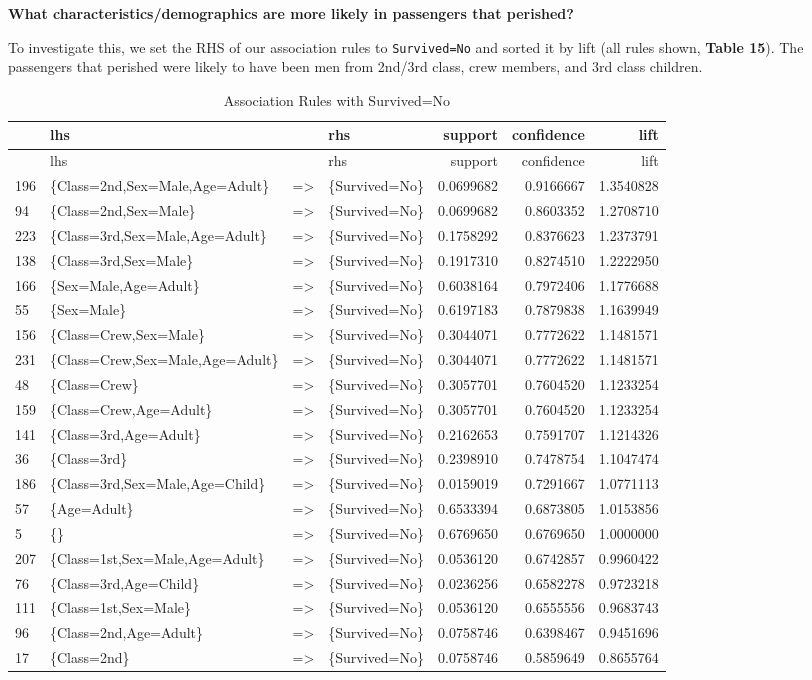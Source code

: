\documentclass[]{article}
\begin{document}
\textbf{What characteristics/demographics are more likely in passengers
that perished?}

To investigate this, we set the RHS of our association rules to
\texttt{Survived=No} and sorted it by lift (all rules shown,
\textbf{Table 15}). The passengers that perished were likely to have
been men from 2nd/3rd class, crew members, and 3rd class children.

\begin{longtable}[c]{@{}llllrrr@{}}
\caption{Association Rules with Survived=No}\tabularnewline
\toprule
& lhs & & rhs & support & confidence & lift\tabularnewline
\midrule
\endfirsthead
\toprule
& lhs & & rhs & support & confidence & lift\tabularnewline
\midrule
\endhead
196 & \{Class=2nd,Sex=Male,Age=Adult\} & =\textgreater{} &
\{Survived=No\} & 0.0699682 & 0.9166667 & 1.3540828\tabularnewline
94 & \{Class=2nd,Sex=Male\} & =\textgreater{} & \{Survived=No\} &
0.0699682 & 0.8603352 & 1.2708710\tabularnewline
223 & \{Class=3rd,Sex=Male,Age=Adult\} & =\textgreater{} &
\{Survived=No\} & 0.1758292 & 0.8376623 & 1.2373791\tabularnewline
138 & \{Class=3rd,Sex=Male\} & =\textgreater{} & \{Survived=No\} &
0.1917310 & 0.8274510 & 1.2222950\tabularnewline
166 & \{Sex=Male,Age=Adult\} & =\textgreater{} & \{Survived=No\} &
0.6038164 & 0.7972406 & 1.1776688\tabularnewline
55 & \{Sex=Male\} & =\textgreater{} & \{Survived=No\} & 0.6197183 &
0.7879838 & 1.1639949\tabularnewline
156 & \{Class=Crew,Sex=Male\} & =\textgreater{} & \{Survived=No\} &
0.3044071 & 0.7772622 & 1.1481571\tabularnewline
231 & \{Class=Crew,Sex=Male,Age=Adult\} & =\textgreater{} &
\{Survived=No\} & 0.3044071 & 0.7772622 & 1.1481571\tabularnewline
48 & \{Class=Crew\} & =\textgreater{} & \{Survived=No\} & 0.3057701 &
0.7604520 & 1.1233254\tabularnewline
159 & \{Class=Crew,Age=Adult\} & =\textgreater{} & \{Survived=No\} &
0.3057701 & 0.7604520 & 1.1233254\tabularnewline
141 & \{Class=3rd,Age=Adult\} & =\textgreater{} & \{Survived=No\} &
0.2162653 & 0.7591707 & 1.1214326\tabularnewline
36 & \{Class=3rd\} & =\textgreater{} & \{Survived=No\} & 0.2398910 &
0.7478754 & 1.1047474\tabularnewline
186 & \{Class=3rd,Sex=Male,Age=Child\} & =\textgreater{} &
\{Survived=No\} & 0.0159019 & 0.7291667 & 1.0771113\tabularnewline
57 & \{Age=Adult\} & =\textgreater{} & \{Survived=No\} & 0.6533394 &
0.6873805 & 1.0153856\tabularnewline
5 & \{\} & =\textgreater{} & \{Survived=No\} & 0.6769650 & 0.6769650 &
1.0000000\tabularnewline
207 & \{Class=1st,Sex=Male,Age=Adult\} & =\textgreater{} &
\{Survived=No\} & 0.0536120 & 0.6742857 & 0.9960422\tabularnewline
76 & \{Class=3rd,Age=Child\} & =\textgreater{} & \{Survived=No\} &
0.0236256 & 0.6582278 & 0.9723218\tabularnewline
111 & \{Class=1st,Sex=Male\} & =\textgreater{} & \{Survived=No\} &
0.0536120 & 0.6555556 & 0.9683743\tabularnewline
96 & \{Class=2nd,Age=Adult\} & =\textgreater{} & \{Survived=No\} &
0.0758746 & 0.6398467 & 0.9451696\tabularnewline
17 & \{Class=2nd\} & =\textgreater{} & \{Survived=No\} & 0.0758746 &
0.5859649 & 0.8655764\tabularnewline
\bottomrule
\end{longtable}
\end{document}
